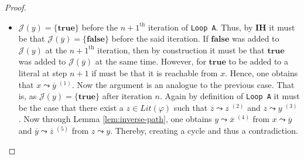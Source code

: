 \documentclass [11pt]{article}
\newcommand{\True}{\mathbf{true}}
\newcommand{\False}{\mathbf{false}}
\newcommand{\lit}{\mathit{Lit}}
\newcommand{\reach}{\leadsto}
\begin{document}
\begin{proof}
\begin{itemize}
\begin{itemize}
\begin{center}
\begin{tikzpicture}
\end{tikzpicture}
\end{center}
 

\item $\mathcal{J}(y)=\{\True\}$ before the $n+1^{\text{th}}$ iteration of \texttt{Loop A}. Thus, by \textbf{IH} it must be that $\mathcal{J}(\overline{y})=\{\False\}$ before the said iteration. If $\False$ was added to $\mathcal{J}(y)$ at the $n+1^{\text{th}}$ iteration, then by construction it must be that $\True$ was added to $\mathcal{J}(\overline{y})$ at the same time. However, for $\True$ to be added to a literal at step $n+1$ if must be that it is reachable from $x$. Hence, one obtains that $x \reach \overline{y}\;^{(1)}$. 
Now the argument is an analogue to the previous case. That is, as $\mathcal{J}(y)=\{\True\}$ after iteration $n$. Again by definition of \texttt{Loop A}  it must be the case that there exist a $z\in \lit(\varphi)$ such that $\overline{z} \reach z\;^{(2)}$ and $z \reach y\;^{(3)}$. Now through Lemma \ref{lem:inverse-path}, one obtains $y \reach \overline{x}\;^{(4)}$ from $x \reach \overline{y}$ and  $\overline{y} \reach \overline{z}\;^{(5)}$ from $z \reach y$. Thereby, creating a cycle and thus a contradiction.

\begin{center}
\end{center}
\end{itemize}
\end{itemize}
\end{proof}
\end{document}

